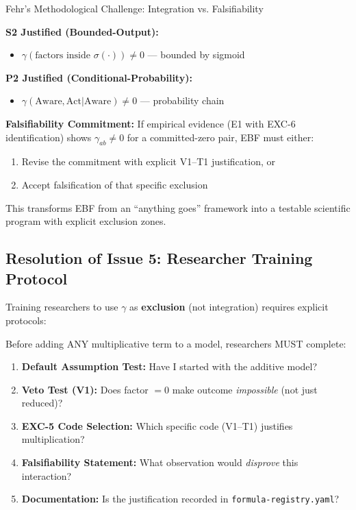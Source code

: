 \begin{chapter}{Fehr's Methodological Challenge: Integration vs. Falsifiability}
\begin{tcolorbox}[colback=green!5!white,colframe=green!75!black,title=\textbf{Permitted $\gamma \neq 0$ (Justified by EXC-5)}]
\textbf{S2 Justified (Bounded-Output):}
\begin{itemize}[noitemsep]
    \item $\gamma(\text{factors inside } \sigma(\cdot)) \neq 0$ --- bounded by sigmoid
\end{itemize}

\textbf{P2 Justified (Conditional-Probability):}
\begin{itemize}[noitemsep]
    \item $\gamma(\text{Aware}, \text{Act}|\text{Aware}) \neq 0$ --- probability chain
\end{itemize}

\end{tcolorbox}

\textbf{Falsifiability Commitment:} If empirical evidence (E1 with EXC-6 identification) shows $\gamma_{ab} \neq 0$ for a committed-zero pair, EBF must either:
\begin{enumerate}[noitemsep]
    \item Revise the commitment with explicit V1--T1 justification, or
    \item Accept falsification of that specific exclusion
\end{enumerate}

This transforms EBF from an ``anything goes'' framework into a testable scientific program with explicit exclusion zones.

\subsection{Resolution of Issue 5: Researcher Training Protocol}
\label{sec:training-protocol}

Training researchers to use $\gamma$ as \textbf{exclusion} (not integration) requires explicit protocols:

\begin{tcolorbox}[colback=orange!5!white,colframe=orange!75!black,title=\textbf{Pre-Modeling Checklist (MANDATORY)}]
Before adding ANY multiplicative term to a model, researchers MUST complete:

\begin{enumerate}[noitemsep]
    \item \textbf{Default Assumption Test:} Have I started with the additive model?
    \item \textbf{Veto Test (V1):} Does factor $= 0$ make outcome \textit{impossible} (not just reduced)?
    \item \textbf{EXC-5 Code Selection:} Which specific code (V1--T1) justifies multiplication?
    \item \textbf{Falsifiability Statement:} What observation would \textit{disprove} this interaction?
    \item \textbf{Documentation:} Is the justification recorded in \texttt{formula-registry.yaml}?
\end{enumerate}


\end{tcolorbox}
\end{chapter}
